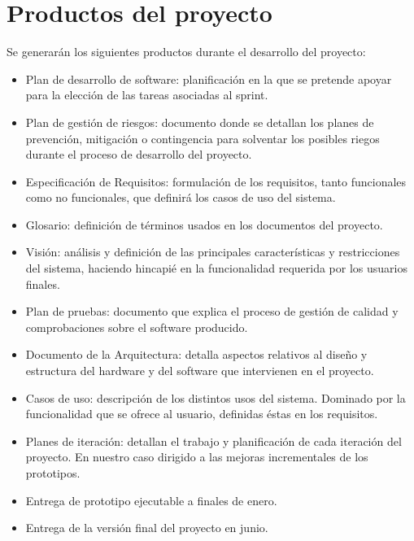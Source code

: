 \section{Productos del proyecto}
Se generarán los siguientes productos durante el desarrollo del proyecto:
\begin{itemize}

\item	Plan de desarrollo de software: planificación en la que se pretende apoyar para la elección de las tareas asociadas al sprint.
\item	Plan de gestión de riesgos: documento donde se detallan los planes de prevención, mitigación o contingencia para solventar los posibles riegos durante el proceso de desarrollo del proyecto.
\item	Especificación de Requisitos: formulación de los requisitos, tanto funcionales como no funcionales, que definirá los casos de uso del sistema.
\item	Glosario: definición de términos usados en los documentos del proyecto.
\item	Visión: análisis y definición de las principales características y restricciones del sistema, haciendo hincapié en la funcionalidad requerida por los usuarios finales.
\item	Plan de pruebas: documento que explica el proceso de gestión de calidad y comprobaciones sobre el software producido.
\item	Documento de la Arquitectura: detalla aspectos relativos al diseño y estructura del hardware y del software que intervienen en el proyecto.
\item	Casos de uso: descripción de los distintos usos del sistema. Dominado por la funcionalidad que se ofrece al usuario, definidas éstas en los requisitos.
\item	Planes de iteración: detallan el trabajo y planificación de cada iteración del proyecto. En nuestro caso dirigido a las mejoras incrementales de los prototipos.
\item	Entrega de prototipo ejecutable a finales de enero.
\item	Entrega de la versión final del proyecto en junio.
\end{itemize}